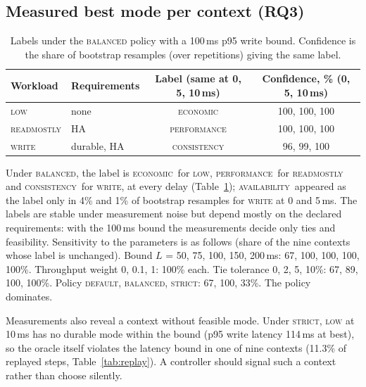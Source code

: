 \documentclass[smallextended]{svjour3}
\newcommand{\perf}{\textsc{performance}}
\newcommand{\cons}{\textsc{consistency}}
\newcommand{\avail}{\textsc{availability}}
\newcommand{\econ}{\textsc{economic}}
\begin{document}
\begin{table}[t]
\centering\footnotesize

\caption{Asynchronous replication, isolation of 2\,s at 5\,ms delay, with the write rate of the eight clients limited by pgbench. Lost = acknowledged transactions absent from the new primary.}\label{tab:rate}
\end{table}

\subsection{Measured best mode per context (RQ3)}
\begin{table}[t]
\centering\footnotesize
\begin{tabular}{llcc}
\toprule
Workload & Requirements & Label (same at 0, 5, 10\,ms) & Confidence, \% (0, 5, 10\,ms) \\
\midrule
\textsc{low} & none & \econ & 100, 100, 100 \\
\textsc{readmostly} & HA & \perf & 100, 100, 100 \\
\textsc{write} & durable, HA & \cons & 96, 99, 100 \\
\bottomrule
\end{tabular}
\caption{Labels under the \textsc{balanced} policy with a 100\,ms p95 write bound. Confidence is the share of bootstrap resamples (over repetitions) giving the same label.}\label{tab:labels}
\end{table}

Under \textsc{balanced}, the label is \econ\ for \textsc{low}, \perf\ for \textsc{readmostly} and \cons\ for \textsc{write}, at every delay (Table~\ref{tab:labels}); \avail\ appeared as the label only in 4\% and 1\% of bootstrap resamples for \textsc{write} at 0 and 5\,ms. The labels are stable under measurement noise but depend mostly on the declared requirements: with the 100\,ms bound the measurements decide only ties and feasibility. Sensitivity to the parameters is as follows (share of the nine contexts whose label is unchanged). Bound $L$ = 50, 75, 100, 150, 200\,ms: 67, 100, 100, 100, 100\%. Throughput weight 0, 0.1, 1: 100\% each. Tie tolerance 0, 2, 5, 10\%: 67, 89, 100, 100\%. Policy \textsc{default}, \textsc{balanced}, \textsc{strict}: 67, 100, 33\%. The policy dominates.

Measurements also reveal a context without feasible mode. Under \textsc{strict}, \textsc{low} at 10\,ms has no durable mode within the bound (p95 write latency 114\,ms at best), so the oracle itself violates the latency bound in one of nine contexts (11.3\% of replayed steps, Table~\ref{tab:replay}). A controller should signal such a context rather than choose silently.
\end{document}
